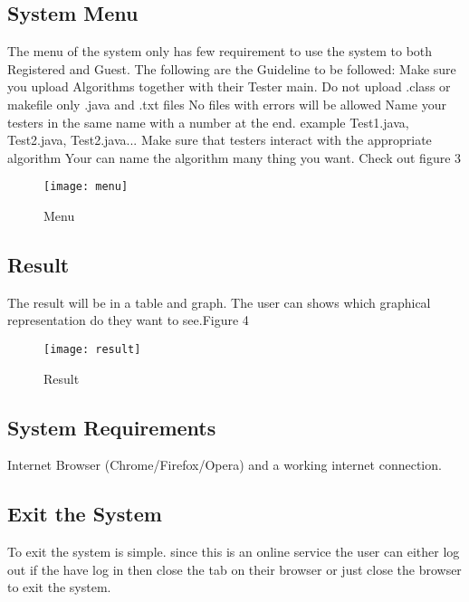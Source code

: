 \documentclass[runningheads,a4paper]{article}
\begin{document}
\subsection{System Menu}
The menu of the system only has few requirement to use the system to both Registered and Guest. The following are the Guideline to be followed:\newline\newline
Make sure you upload Algorithms together with their Tester main.\newline
Do not upload .class or makefile only .java and .txt files \newline
No files with errors will be allowed\newline
Name your testers in the same name with a number at the end. example Test1.java, Test2.java, Test2.java...\newline
Make sure that testers interact with the appropriate algorithm\newline
Your can name the algorithm many thing you want.\newline
Check out figure 3

\begin{figure}[ht]
\centering
\texttt{[image: menu]}
\caption{Menu}
\label{fig:lion}
\end{figure}

\subsection{Result}
The result will be in a table and graph. The user can shows which graphical representation do they want to see.Figure 4
\begin{figure}[htp]
\centering
\texttt{[image: result]}
\caption{Result}
\label{fig:lion}
\end{figure}
\subsection{System Requirements}
	Internet Browser (Chrome/Firefox/Opera) and a working internet connection.
\subsection{Exit the System}
To exit the system is simple. since this is an online service the user can either log out if the have log in then close the tab on their browser or just close the browser to exit the system.\newline
\end{document}
